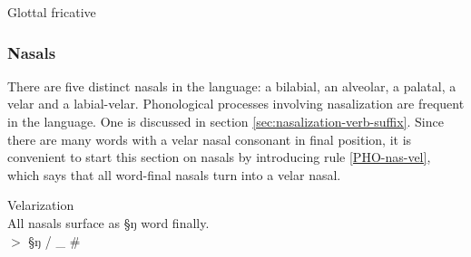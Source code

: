 \begin{table}[!htb]
\centering
\caption{Glottal  fricative\label{tab:glottal-fricative}}

\quad
{}



\end{table}






\subsubsection{Nasals}
There are  five distinct nasals in the language: a bilabial, an alveolar, a
palatal, a velar and a labial-velar. Phonological processes involving
nasalization are frequent in the language. One is discussed in section
\ref{sec:nasalization-verb-suffix}. Since there are many words  with a velar
nasal
consonant
in  final position,  it is convenient to start this section on nasals by
introducing rule 
\ref{PHO-nas-vel},  which says that all word-final nasals turn into a velar
nasal.

\begin{Rule}\label{PHO-nas-vel}{Velarization}\\
All nasals surface as {\S ŋ} word finally.\\
{\sc [nasal]} $>$ {\S ŋ} / \_ \#
\end{Rule}



